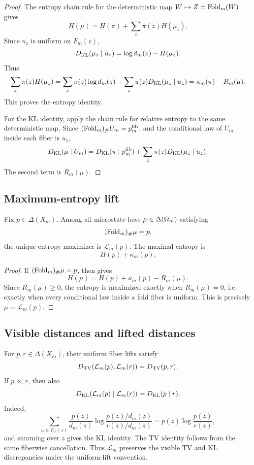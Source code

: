 \begin{proof}
The entropy chain rule for the deterministic map \(W\mapsto Z=\operatorname{Fold}_m(W)\) gives
\[
H(\mu)=H(\pi)+\sum_z\pi(z)H(\mu_z).
\]
Since \(u_z\) is uniform on \(F_m(z)\),
\[
D_{\mathrm{KL}}(\mu_z\mid u_z)=\log d_m(z)-H(\mu_z).
\]
Thus
\[
\sum_z\pi(z)H(\mu_z)
=
\sum_z\pi(z)\log d_m(z)
-
\sum_z\pi(z)D_{\mathrm{KL}}(\mu_z\mid u_z)
=
\kappa_m(\pi)-R_m(\mu).
\]
This proves the entropy identity.

For the KL identity, apply the chain rule for relative entropy to the same deterministic map.  Since \((\operatorname{Fold}_m)_\#U_m=p_m^{\mathrm{fib}}\), and the conditional law of \(U_m\) inside each fiber is \(u_z\),
\[
D_{\mathrm{KL}}(\mu\mid U_m)
=
D_{\mathrm{KL}}(\pi\mid p_m^{\mathrm{fib}})
+\sum_z\pi(z)D_{\mathrm{KL}}(\mu_z\mid u_z).
\]
The second term is \(R_m(\mu)\).
\end{proof}

\subsection{Maximum-entropy lift}

\begin{theorem}
\label{thm:maximum-entropy-lift}
Fix \(p\in\Delta(X_m)\).  Among all microstate laws \(\mu\in\Delta(\Omega_m)\) satisfying
\[
(\operatorname{Fold}_m)_\#\mu=p,
\]
the unique entropy maximizer is \(\mathcal L_m(p)\).  The maximal entropy is
\[
H(p)+\kappa_m(p).
\]
\end{theorem}

\begin{proof}
If \((\operatorname{Fold}_m)_\#\mu=p\), then  gives
\[
H(\mu)=H(p)+\kappa_m(p)-R_m(\mu).
\]
Since \(R_m(\mu)\ge0\), the entropy is maximized exactly when \(R_m(\mu)=0\), i.e. exactly when every conditional law inside a fold fiber is uniform.  This is precisely \(\mu=\mathcal L_m(p)\).
\end{proof}

\subsection{Visible distances and lifted distances}

For \(p,r\in\Delta(X_m)\), their uniform fiber lifts satisfy
\[
D_{\mathrm{TV}}(\mathcal L_m(p),\mathcal L_m(r))=D_{\mathrm{TV}}(p,r).
\]
If \(p\ll r\), then also
\[
D_{\mathrm{KL}}(\mathcal L_m(p)\mid\mathcal L_m(r))=D_{\mathrm{KL}}(p\mid r).
\]
Indeed,
\[
\sum_{\omega\in F_m(z)}
\frac{p(z)}{d_m(z)}
\log
\frac{p(z)/d_m(z)}{r(z)/d_m(z)}
=
p(z)\log\frac{p(z)}{r(z)},
\]
and summing over \(z\) gives the KL identity.  The TV identity follows from the same fiberwise cancellation.  Thus \(\mathcal L_m\) preserves the visible TV and KL discrepancies under the uniform-lift convention.

